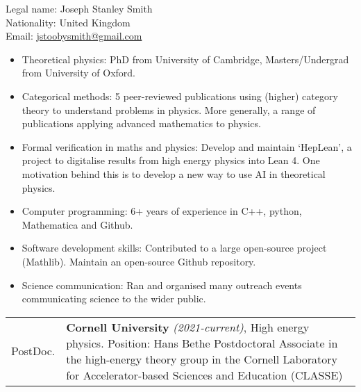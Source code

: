 \documentclass[14pt,letter]{article}
\newcommand{\mybullet}{\textcolor{mycolor}{$\ast$}\ }
\newcounter{customtitle}
\begin{document}
\vspace{-2cm}
\begin{flushright}
{{\color{white}Legal name: Joseph Stanley Smith  \\
{\color{white}Nationality:} United Kingdom$\;\;\;\;\;\;\;\,\,$\\
{\color{white}Email:} \href{mailto:jstoobysmith@gmail.com}{jstoobysmith@gmail.com}$\;\;\;\;$}}
\end{flushright}
\vspace{1cm}
	
\noindent 
\vspace{0.3cm}
\begin{itemize}[label=\mybullet]
	\item Theoretical physics: PhD from University of Cambridge, Masters/Undergrad from University of Oxford. 
	\item Categorical methods: 5 peer-reviewed publications using (higher) category theory to understand problems in physics. More generally, a range of publications applying advanced mathematics to physics.
 	\item Formal verification in maths and physics: Develop and maintain `HepLean', a project to digitalise results from high energy physics into Lean 4. One motivation behind this is to develop a new way to use AI in theoretical physics.
 	\item Computer programming: 6+ years of experience in C++, python, Mathematica and Github.
 	\item Software development skills: Contributed to a large open-source project (Mathlib). Maintain an open-source Github repository. 
 	\item Science communication: Ran and organised many outreach events communicating science to the wider public. 
\end{itemize}


\noindent\begin{tabular}{p{}p{}}
	PostDoc. &  \textbf{Cornell University} \emph{(2021-current)}, High energy physics.
	\newline 
	{\color{mycolor} Position:}  Hans Bethe Postdoctoral Associate in the high-energy theory group in the Cornell Laboratory for Accelerator-based Sciences and Education (CLASSE)
\end{tabular}
\end{document}
